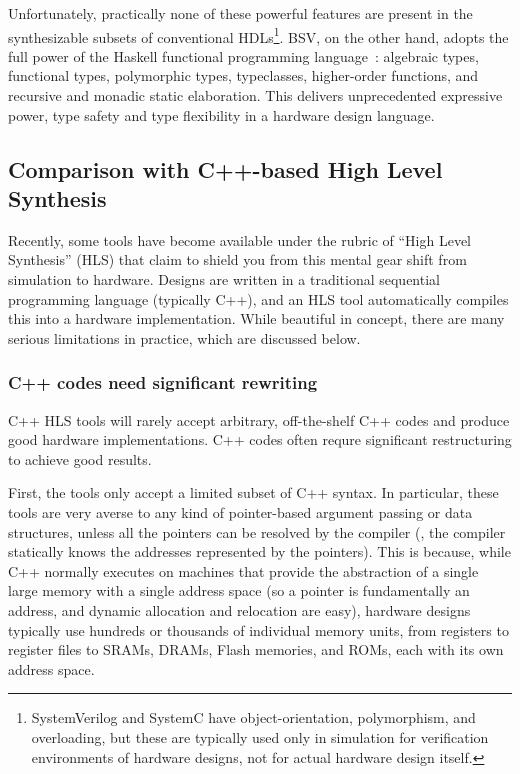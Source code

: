 Unfortunately, practically none of these powerful features are present
in the synthesizable subsets of conventional
HDLs\footnote{SystemVerilog and SystemC have object-orientation,
polymorphism, and overloading, but these are typically used only in
simulation for verification environments of hardware designs, not for
actual hardware design itself.}.  BSV, on the other hand, adopts the
full power of the Haskell functional programming
language~\cite{PeytonJones2003}: algebraic types, functional types,
polymorphic types, typeclasses, higher-order functions, and recursive
and monadic static elaboration.  This delivers unprecedented
expressive power, type safety and type flexibility in a hardware
design language.


\subsection{Comparison with C++-based High Level Synthesis}

\label{apx_HLS}

Recently, some tools have become available under the rubric of ``High
Level Synthesis'' (HLS) that claim to shield you from this mental gear
shift from simulation to hardware.  Designs are written in a
traditional sequential programming language (typically C++), and an
HLS tool automatically compiles this into a hardware implementation.
While beautiful in concept, there are many serious limitations in
practice, which are discussed below.


\subsubsection{C++ codes need significant rewriting}

C++ HLS tools will rarely accept arbitrary, off-the-shelf C++ codes
and produce good hardware implementations.  C++ codes often requre
significant restructuring to achieve good results.

First, the tools only accept a limited subset of C++ syntax. In
particular, these tools are very averse to any kind of pointer-based
argument passing or data structures, unless all the pointers can be
resolved by the compiler ({\ie}, the compiler statically knows the
addresses represented by the pointers).  This is because, while C++
normally executes on machines that provide the abstraction of a single
large memory with a single address space (so a pointer is
fundamentally an address, and dynamic allocation and relocation are
easy), hardware designs typically use hundreds or thousands of
individual memory units, from registers to register files to SRAMs,
DRAMs, Flash memories, and ROMs, each with its own address space.

